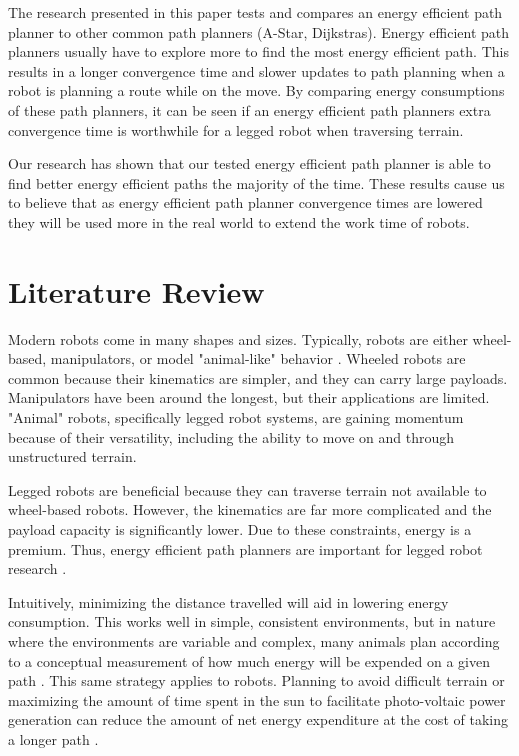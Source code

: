 \documentclass[conference]{IEEEtran}
\begin{document}
    The research presented in this paper tests and compares an energy efficient path planner to other common path planners (A-Star, Dijkstras). Energy efficient path planners usually have to explore more to find the most energy efficient path. This results in a longer convergence time and slower updates to path planning when a robot is planning a route while on the move. By comparing energy consumptions of these path planners, it can be seen if an energy efficient path planners extra convergence time is worthwhile for a legged robot when traversing terrain. 
    
    Our research has shown that our tested energy efficient path planner is able to find better energy efficient paths the majority of the time. These results cause us to believe that as energy efficient path planner convergence times are lowered they will be used more in the real world to extend the work time of robots. 
    
\section{Literature Review}

    Modern robots come in many shapes and sizes. Typically, robots are either wheel-based, manipulators, or model "animal-like" behavior \cite{BING2020323, 8946895, mario}. Wheeled robots are common because their kinematics are simpler, and they can carry large payloads. Manipulators have been around the longest, but their applications are limited. "Animal" robots, specifically legged robot systems, are gaining momentum because of their versatility, including the ability to move on and through unstructured terrain.
    
    Legged robots are beneficial because they can traverse terrain not available to wheel-based robots. However, the kinematics are far more complicated and the payload capacity is significantly lower. Due to these constraints, energy is a premium. Thus, energy efficient path planners are important for legged robot research \cite{mario, aau5872}.
    
    Intuitively, minimizing the distance travelled will aid in lowering energy consumption. This works well in simple, consistent environments, but in nature where the environments are variable and complex, many animals plan according to a conceptual measurement of how much energy will be expended on a given path \cite{mousas2013minimum}. This same strategy applies to robots. Planning to avoid difficult terrain or maximizing the amount of time spent in the sun to facilitate photo-voltaic power generation can reduce the amount of net energy expenditure at the cost of taking a longer path \cite{plonski2013energy, wu2019energy}.
    
\end{document}
